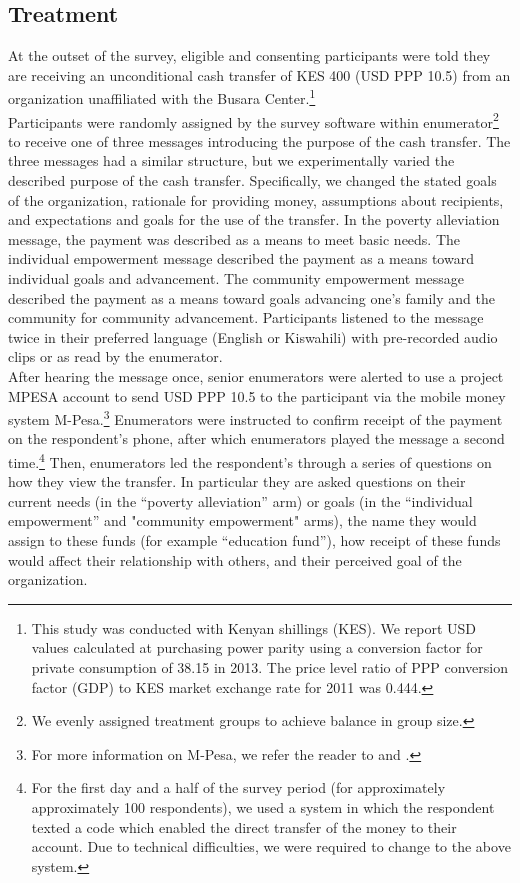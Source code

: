 \documentclass[11pt, a4paper]{article}\usepackage[]{graphicx}\usepackage[]{color}
\begin{document}
    \subsection{Treatment}

        At the outset of the survey, eligible and consenting participants were told they are receiving an unconditional cash transfer of KES 400 (USD PPP 10.5) from an organization unaffiliated with the Busara Center.\footnote{This study was conducted with Kenyan shillings (KES). We report USD values calculated at purchasing power parity using a conversion factor for private consumption of 38.15 in 2013. The price level ratio of PPP conversion factor (GDP) to KES market exchange rate for 2011 was 0.444.} \\
        
        Participants were randomly assigned by the survey software within enumerator\footnote{We evenly assigned treatment groups to achieve balance in group size.} to receive one of three messages introducing the purpose of the cash transfer. The three messages had a similar structure, but we experimentally varied the described purpose of the cash transfer. Specifically, we changed the stated goals of the organization, rationale for providing money, assumptions about recipients, and expectations and goals for the use of the transfer. In the poverty alleviation message, the payment was described as a means to meet basic needs. The individual empowerment message described the payment as a means toward individual goals and advancement. The community empowerment message described the payment as a means toward goals advancing one's family and the community for community advancement. Participants listened to the message twice in their preferred language (English or Kiswahili) with pre-recorded audio clips or as read by the enumerator. \\

        After hearing the message once, senior enumerators were alerted to use a project MPESA account to send USD PPP 10.5 to the participant via the mobile money system M-Pesa.\footnote{For more information on M-Pesa, we refer the reader to \textcite{jack_mobile_2011} and \textcite{mbiti_mobile_2011}.} Enumerators were instructed to confirm receipt of the payment on the respondent's phone, after which enumerators played the message a second time.\footnote{For the first day and a half of the survey period (for approximately approximately 100 respondents), we used a system in which the respondent texted a code which enabled the direct transfer of the money to their account. Due to technical difficulties, we were required to change to the above system.} Then, enumerators led the respondent's through a series of questions on how they view the transfer. In particular they are asked questions on their current needs (in the ``poverty alleviation'' arm) or goals (in the ``individual empowerment'' and "community empowerment" arms), the name they would assign to these funds (for example ``education fund''), how receipt of these funds would affect their relationship with others, and their perceived goal of the organization. \\
\end{document}

